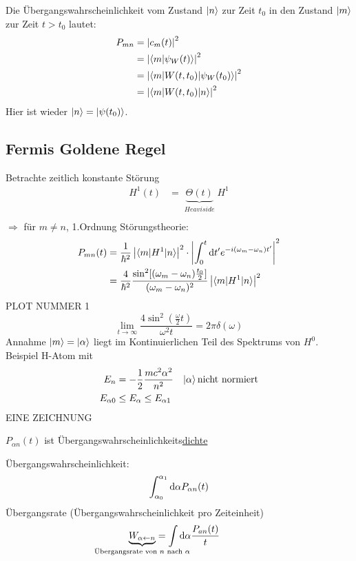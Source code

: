 	Die Übergangswahrscheinlichkeit vom Zustand $\ket{n}$ zur Zeit $t_0$ in den Zustand $\ket{m}$ zur Zeit $t>t_0$ lautet:
		\begin{align*}
			P_{mn} &= \left| c_m(t) \right|^2 \\
			&= \left| \braket{m | \psi_W(t)} \right|^2 \\
			&= \left| \braket{m | W(t,t_0) | \psi_W(t_0)} \right|^2 \\
			&= \left| \braket{m | W(t,t_0) | n}\right|^2
		\end{align*}
	Hier ist wieder $\ket{n} = \ket{\psi(t_0)}$.
\subsection{Fermis Goldene Regel}
	Betrachte zeitlich konstante Störung
		\begin{align*}
			H^1(t) &= \underbrace{\Theta (t)}_{\substack{Heaviside}} H^1 \\
		\end{align*}
	$\Rightarrow$ für $m \neq n$, 1.Ordnung Störungstheorie:
		\begin{align*}
			P_{mn}(t) 
			&= \frac{1}{\hbar^2} \left| \braket{m | H^1 | n}\right|^2 
			\cdot \left| \int_{0}^{t} \mathrm{d} t' e^{-i(\omega_m-\omega_n) t'} \right|^2 \\
			&= \frac{4}{\hbar^2} \frac{\sin^2[(\omega_m-\omega_n)
			\frac{t_0}{2}]}{(\omega_m-\omega_n)^2} 
			\left| \braket{m | H^1 | n}\right|^2
		\end{align*}
	PLOT NUMMER 1
		\begin{equation*}
			\lim\limits_{t \rightarrow \infty} \frac{4 \sin^2(\frac{\omega}{2} t)}{\omega^2 t} = 2 \pi \delta (\omega)
		\end{equation*}
	Annahme $\ket{m} = \ket{\alpha}$ liegt im Kontinuierlichen Teil des Spektrums von $H^0$. Beispiel H-Atom mit
		\begin{align*}
			E_n &= - \frac{1}{2} \frac{m c^2 \alpha^2}{n^2} &
			\ket{\alpha} \text{nicht normiert} \\
			E_{\alpha 0} &\leq E_\alpha \leq E_{\alpha 1}
		\end{align*}
	EINE ZEICHNUNG

	$P_{\alpha n}(t)$ ist Übergangswahrscheinlichkeits\underline{dichte}
	
	Übergangswahrscheinlichkeit: 
		\begin{equation*}
			\int_{\alpha_0}^{\alpha_1} \mathrm{d} \alpha P_{\alpha n} (t)
		\end{equation*}
	Übergangsrate (Übergangswahrscheinlichkeit pro Zeiteinheit)
		\begin{align*}
			\underbrace{W_{\alpha \leftarrow n}}_{
				\mathclap{\text{Übergangsrate von~} n \text{~nach~} \alpha}}
			&= \int \diff \alpha \frac{P_{an}(t)}{t}
		\end{align*}